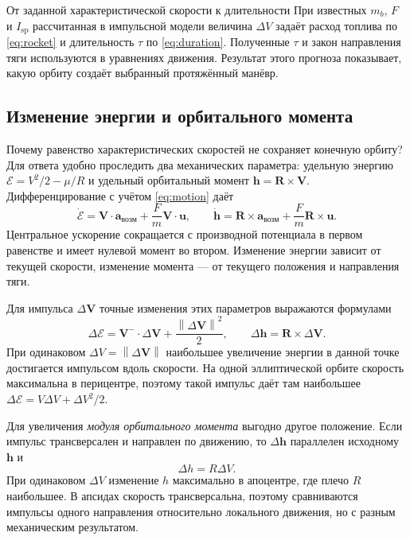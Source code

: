 \documentclass[a4paper,11pt]{article}
\newcommand{\vect}[1]{\boldsymbol{#1}}
\newcommand{\norm}[1]{\left\lVert#1\right\rVert}
\numberwithin{equation}{section}
\begin{document}
\begin{explanation}{От заданной характеристической скорости к длительности}
При известных $m_b$, $F$ и $I_{\mathrm{sp}}$ рассчитанная в импульсной
модели величина $\Delta V$ задаёт расход топлива по
\eqref{eq:rocket} и длительность $\tau$ по \eqref{eq:duration}.
Полученные $\tau$ и закон направления тяги используются
в уравнениях движения. Результат этого прогноза показывает,
какую орбиту создаёт выбранный протяжённый манёвр.
\end{explanation}

\subsection{Изменение энергии и орбитального момента}

Почему равенство характеристических скоростей не сохраняет
конечную орбиту? Для ответа удобно проследить два механических
параметра: удельную энергию
$\mathcal E=V^2/2-\mu/R$ и удельный орбитальный момент
$\vect h=\vect R\times\vect V$.
Дифференцирование с учётом \eqref{eq:motion} даёт
\begin{equation}
\dot{\mathcal E}=\vect V\cdot\vect a_{\text{возм}}
 +\frac{F}{m}\vect V\cdot\vect u,\qquad
\dot{\vect h}=\vect R\times\vect a_{\text{возм}}
 +\frac{F}{m}\vect R\times\vect u.
\label{eq:energy-momentum}
\end{equation}
Центральное ускорение сокращается с производной потенциала
в первом равенстве и имеет нулевой момент во втором.
Изменение энергии зависит от текущей скорости,
изменение момента --- от текущего положения и направления тяги.

Для импульса $\Delta\vect V$ точные изменения этих параметров
выражаются формулами
\begin{equation}
\Delta\mathcal E=\vect V^-\cdot\Delta\vect V
 +\frac{\norm{\Delta\vect V}^2}{2},\qquad
\Delta\vect h=\vect R\times\Delta\vect V.
\label{eq:impulse-invariants}
\end{equation}
При одинаковом $\Delta V=\norm{\Delta\vect V}$ наибольшее
увеличение энергии в данной точке достигается импульсом вдоль
скорости. На одной эллиптической орбите скорость максимальна
в перицентре, поэтому такой импульс даёт там наибольшее
$\Delta\mathcal E=V\Delta V+\Delta V^2/2$.

Для увеличения \emph{модуля орбитального момента} выгодно другое
положение. Если импульс трансверсален и направлен по движению,
то $\Delta\vect h$ параллелен исходному $\vect h$ и
\[
\Delta h=R\Delta V.
\]
При одинаковом $\Delta V$ изменение $h$ максимально в апоцентре,
где плечо $R$ наибольшее. В апсидах скорость трансверсальна,
поэтому сравниваются импульсы одного направления относительно
локального движения, но с разным механическим результатом.
\end{document}
